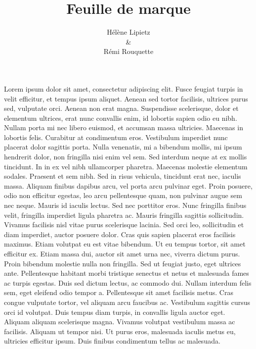 \documentclass[twoside,a4paper]{article}
\makeatletter
\renewcommand{\maketitle}{
\strut\vfill
\begin{center}

\emph{\@title}

\@author

{\small\@date}

\end{center}
\vfill
}
\makeatother
\begin{document}
\fancyfoot[CE]{\thepage}
\fancyfoot[CO]{\thepage}
\fancyhead{}

\title{Feuille de marque}
\author{Hélène Lipietz\\
&\\
Rémi Rouquette
}

\begin{simple}

\maketitle

\end{simple}

\begin{triple}
Lorem ipsum dolor sit amet, consectetur adipiscing elit. Fusce feugiat turpis in velit efficitur, et tempus ipsum aliquet. Aenean sed tortor facilisis, ultrices purus sed, vulputate orci. Aenean non erat magna. Suspendisse scelerisque, dolor et elementum ultrices, erat nunc convallis enim, id lobortis sapien odio eu nibh. Nullam porta mi nec libero euismod, et accumsan massa ultricies. Maecenas in lobortis felis. Curabitur at condimentum eros. Vestibulum imperdiet nunc placerat dolor sagittis porta. Nulla venenatis, mi a bibendum mollis, mi ipsum hendrerit dolor, non fringilla nisi enim vel sem. Sed interdum neque at ex mollis tincidunt. In in ex vel nibh ullamcorper pharetra. Maecenas molestie elementum sodales. Praesent et sem nibh. Sed in risus vehicula, tincidunt erat nec, iaculis massa. Aliquam finibus dapibus arcu, vel porta arcu pulvinar eget. Proin posuere, odio non efficitur egestas, leo arcu pellentesque quam, non pulvinar augue sem nec neque.
Mauris id iaculis lectus. Sed nec porttitor eros. Nunc fringilla finibus velit, fringilla imperdiet ligula pharetra ac. Mauris fringilla sagittis sollicitudin. Vivamus facilisis nisl vitae purus scelerisque lacinia. Sed orci leo, sollicitudin et diam imperdiet, auctor posuere dolor. Cras quis sapien placerat eros facilisis maximus. Etiam volutpat eu est vitae bibendum. Ut eu tempus tortor, sit amet efficitur ex. Etiam massa dui, auctor sit amet urna nec, viverra dictum purus. Proin bibendum molestie nulla non fringilla. Sed ut feugiat justo, eget ultrices ante. Pellentesque habitant morbi tristique senectus et netus et malesuada fames ac turpis egestas.
Duis sed dictum lectus, ac commodo dui. Nullam interdum felis sem, eget eleifend odio tempor a. Pellentesque sit amet facilisis metus. Cras congue vulputate tortor, vel aliquam arcu faucibus ac. Vestibulum sagittis cursus orci id volutpat. Duis tempus diam turpis, in convallis ligula auctor eget. Aliquam aliquam scelerisque magna. Vivamus volutpat vestibulum massa ac facilisis. Aliquam ut tempor nisi. Ut purus eros, malesuada iaculis metus eu, ultricies efficitur ipsum. Duis finibus condimentum tellus ac malesuada.

\end{triple}
\end{document}
